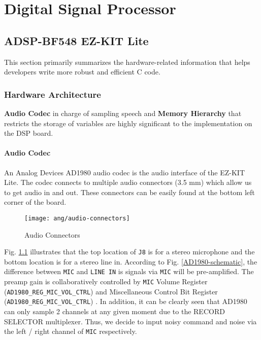 \chapter{Digital Signal Processor}
\label{chapter:dsp}


\section{ADSP-BF548 EZ-KIT Lite}

This section primarily summarizes the hardware-related information that helps developers write more robust and efficient C code.


\subsection{Hardware Architecture}

\textbf{Audio Codec} in charge of sampling speech and \textbf{Memory Hierarchy} that restricts the storage of variables are highly significant to the implementation on the DSP board.


\subsubsection{Audio Codec}
An Analog Devices AD1980 audio codec is the audio interface of the EZ-KIT Lite. The codec connects to multiple audio connectors (3.5 mm) which allow us to get audio in and out. These connectors can be easily found at the bottom left corner of the board.

\begin{figure}[H]
\centering
\texttt{[image: ang/audio-connectors]}
\caption{Audio Connectors}
\label{audio-connectors}
\end{figure}

Fig. \ref{audio-connectors} illustrates that the top location of \texttt{J8} is for a stereo microphone and the bottom location is for a stereo line in. According to Fig. \ref{AD1980-schematic}, the difference between \texttt{MIC} and \texttt{LINE IN} is signals via \texttt{MIC} will be pre-amplified. The preamp gain is collaboratively controlled by \texttt{MIC} Volume Register (\texttt{AD1980\_REG\_MIC\_VOL\_CTRL}) and Miscellaneous Control Bit Register (\texttt{AD1980\_REG\_MIC\_VOL\_CTRL}) \cite{AC97-codec}. In addition, it can be clearly seen that AD1980 can only sample 2 channels at any given moment due to the RECORD SELECTOR multiplexer. Thus, we decide to input noisy command and noise via the left / right channel of \texttt{MIC} respectively.

